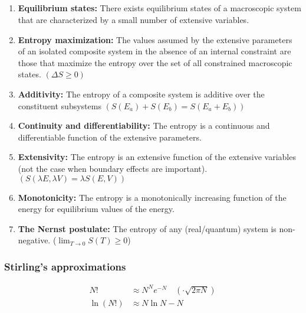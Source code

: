 \documentclass[a4paper, english, 12pt]{article}
\begin{document}
\tiny
\begin{multicols*}{2}


\subsection*{}

\begin{enumerate}
    \item \textbf{Equilibrium states:} There exists equilibrium states of a macroscopic system that are characterized by a small number of extensive variables. 
    \item \textbf{Entropy maximization:} The values assumed by the extensive parameters of an isolated composite system in the absence of an internal constraint are those that maximize the entropy over the set of all constrained macroscopic states. $(\Delta S \geq 0)$
    \item \textbf{Additivity:} The entropy of a composite system is additive over the constituent subsystems $(S(E_a)+S(E_b) = S(E_a+E_b))$
    \item \textbf{Continuity and differentiability:} The entropy is a continuous and differentiable function of the extensive parameters. 
    \item \textbf{Extensivity:} The entropy is an extensive function of the extensive variables (not the case when boundary effects are important). $(S(\lambda E, \lambda V)=\lambda S(E,V))$
    \item \textbf{Monotonicity:} The entropy is a monotonically increasing function of the energy for equilibrium values of the energy. 
    \item \textbf{The Nernst postulate:} The entropy of any (real/quantum) system is non-negative. ($\lim_{T\to0} S(T)\geq0$)
\end{enumerate}


\subsubsection*{}
\subsubsection*{\scriptsize Stirling's approximations}
\begin{align*}
  N! &\approx N^Ne^{-N}\quad(\cdot \sqrt{2\pi N}) \\
  \ln{(N!)} &\approx N\ln{N}-N \\
\end{align*}


\end{multicols*}
\end{document}

